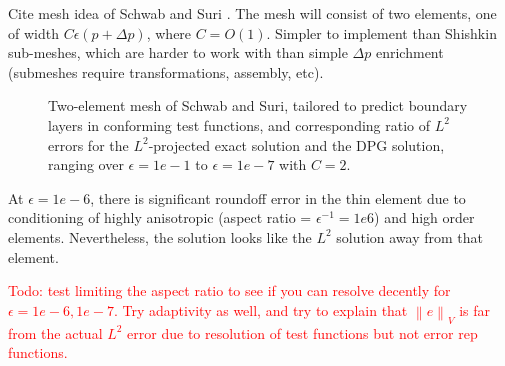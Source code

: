 \documentclass[11pt,onecolumn]{scrartcl}
\newcommand{\nor}[1]{\left\| #1 \right\|}
\newcommand{\del}{\Delta}
\begin{document}
Cite mesh idea of Schwab and Suri \cite{SchwabBoundaryLayers}.  The mesh will consist of two elements, one of width $C\epsilon(p+\del p)$, where $C = O(1)$.  Simpler to implement than Shishkin sub-meshes, which are harder to work with than simple $\del p$ enrichment (submeshes require transformations, assembly, etc).  
\begin{figure}[!h]
\centering
{}
\caption{Two-element mesh of Schwab and Suri, tailored to predict boundary layers in conforming test functions, and corresponding ratio of $L^2$ errors for the $L^2$-projected exact solution and the DPG solution, ranging over $\epsilon = 1e-1$ to $\epsilon = 1e-7$ with $C=2$. 
}
\label{fig:schwabSuriMesh}
\end{figure}

At $\epsilon = 1e-6$, there is significant roundoff error in the thin element due to conditioning of highly anisotropic (aspect ratio = $\epsilon^{-1} = 1e6$) and high order elements.  Nevertheless, the solution looks like the $L^2$ solution away from that element.  

\textcolor{red}{Todo: test limiting the aspect ratio to see if you can resolve decently for $\epsilon = 1e-6, 1e-7$.  Try adaptivity as well, and try to explain that $\nor{e}_V$ is far from the actual $L^2$ error due to resolution of test functions but not error rep functions.}
\end{document}

